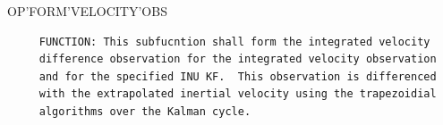 \begin{frame}
OP'FORM'VELOCITY'OBS
\begin{verbatim}
     FUNCTION: This subfucntion shall form the integrated velocity
     difference observation for the integrated velocity observation 
     and for the specified INU KF.  This observation is differenced
     with the extrapolated inertial velocity using the trapezoidial
     algorithms over the Kalman cycle.

\end{verbatim}
\end{frame}
